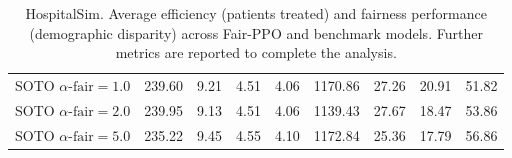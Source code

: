 \begin{table*}
{\begin{tabular}{ l S[table-format=3.2] S[table-format=2.2] S[table-format=1.2] S[table-format=1.2] S[table-format=4.2] S[table-format=2.2] S[table-format=2.2] S[table-format=2.2] }
SOTO $\alpha\text{-fair}=1.0$ & 239.60 & 9.21 & 4.51 & 4.06 & 1170.86 & 27.26 & 20.91 & 51.82 \\
SOTO $\alpha\text{-fair}=2.0$ & 239.95 & 9.13 & 4.51 & 4.06 & 1139.43 & 27.67 & 18.47 & 53.86 \\
SOTO $\alpha\text{-fair}=5.0$ & 235.22 & 9.45 & 4.55 & 4.10 & 1172.84 & 25.36 & 17.79 & 56.86 \\
\bottomrule
\end{tabular}}%
\caption{HospitalSim. Average efficiency (patients treated) and fairness performance (demographic disparity) across Fair-PPO and benchmark models. Further metrics are reported to complete the analysis.}
\label{HS-test-results-full}
\end{table*}